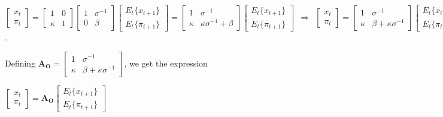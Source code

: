 \documentclass[
]{article}
\begin{document}
\(\displaystyle \left[ \begin{matrix} x_t\\ \pi_t \end{matrix} \right] = \left[ \begin{matrix} 1 & 0\\ \kappa & 1 \end{matrix} \right] \left[ \begin{matrix} 1 & \sigma^{-1} \\ 0 & \beta \end{matrix} \right] \left[ \begin{matrix} E_t\{x_{t+1} \}\\ E_t \{\pi_{t+1} \} \end{matrix} \right] = \left[ \begin{matrix} 1 & \sigma^{-1} \\ \kappa & \kappa \sigma^{-1}+ \beta \end{matrix} \right] \left[ \begin{matrix} E_t\{x_{t+1} \}\\ E_t \{\pi_{t+1} \} \end{matrix} \right] \ \ \Rightarrow \ \ \left[ \begin{matrix} x_t\\ \pi_t \end{matrix} \right] = \left[ \begin{matrix} 1 & \sigma^{-1} \\ \kappa & \beta +\kappa \sigma^{-1} \end{matrix} \right] \left[ \begin{matrix} E_t\{x_{t+1} \}\\ E_t \{\pi_{t+1} \} \end{matrix} \right]\).

Defining
\(\mathbf{A_O}=\left[ \begin{matrix} 1 & \sigma^{-1} \\ \kappa & \beta +\kappa \sigma^{-1} \end{matrix} \right]\),
we get the expression

\(\displaystyle \left[ \begin{matrix} x_t\\ \pi_t \end{matrix} \right] =\mathbf{A_O} \left[ \begin{matrix} E_t\{x_{t+1} \}\\ E_t \{\pi_{t+1} \} \end{matrix} \right]\)

\vspace{12pt}
\end{document}
